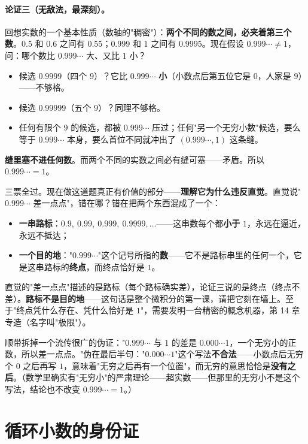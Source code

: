 \paragraph{论证三（无敌法，最深刻）。}回想实数的一个基本性质（数轴的"稠密"）：\textbf{两个不同的数之间，必夹着第三个数}。$0.5$ 和 $0.6$ 之间有 $0.55$；$0.999$ 和 $1$ 之间有 $0.9995$。现在假设 $0.999\cdots \ne 1$，问：哪个数比 $0.999\cdots$ 大、又比 $1$ 小？
\begin{itemize}
\item 候选 $0.9999$（四个 $9$）？它比 $0.999\cdots$ \textbf{小}（小数点后第五位它是 $0$，人家是 $9$）——不够格。
\item 候选 $0.99999$（五个 $9$）？同理不够格。
\item 任何有限个 $9$ 的候选，都被 $0.999\cdots$ 压过；任何"另一个无穷小数"候选，要么等于 $0.999\cdots$ 本身，要么首位不同就冲出了 $(0.999\cdots, 1)$ 这条缝。
\end{itemize}
\textbf{缝里塞不进任何数}。而两个不同的实数之间必有缝可塞——矛盾。所以 $0.999\cdots = 1$。

三票全过。现在做这道题真正有价值的部分——\textbf{理解它为什么违反直觉}。直觉说"$0.999\cdots$ 差一点点"，错在哪？错在把两个东西混成了一个：
\begin{itemize}
\item \textbf{一串路标}：$0.9,\ 0.99,\ 0.999,\ 0.9999, \dots$——这串数每个都\textbf{小于} $1$，永远在逼近，永远不抵达；
\item \textbf{一个目的地}："$0.999\cdots$"这个记号所指的\textbf{数}——它不是路标串里的任何一个，它是这串路标的\textbf{终点}，而终点恰好是 $1$。
\end{itemize}
直觉的"差一点点"描述的是路标（每个路标确实差），论证三说的是终点（终点不差）。\textbf{路标不是目的地}——这句话是整个微积分的第一课，请把它刻在墙上。至于"终点凭什么存在、凭什么恰好是 $1$"，需要发明一台精密的概念机器，第 14 章专造（名字叫"极限"）。

顺带拆掉一个流传很广的伪证："$0.999\cdots$ 与 $1$ 的差是 $0.000\cdots1$，一个无穷小的正数，所以差一点点。"伪在最后半句："$0.000\cdots1$"这个写法\textbf{不合法}——小数点后无穷个 $0$ 之后再写 $1$，意味着"无穷之后再有一个位置"，而无穷的意思恰恰是\textbf{没有之后}。（数学里确实有"无穷小"的严肃理论——超实数——但那里的无穷小不是这个写法，结论也不改变 $0.999\cdots = 1$。）

\section{循环小数的身份证}

